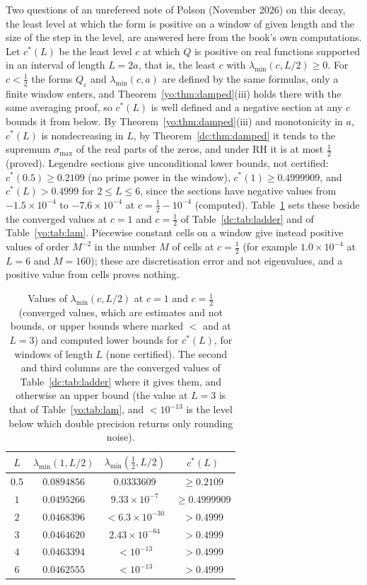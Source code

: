 Two questions of an unrefereed note of Polson (November 2026) on this decay, the least level at which the form is positive on a window of given length and the size of the step in the level, are answered here from the book's own computations. Let $c^*(L)$ be the least level $c$ at which $Q$ is positive on real functions supported in an interval of length $L=2a$, that is, the least $c$ with $\lambda_{\min}(c,L/2)\ge0$. For $c<\frac12$ the forms $Q_\varepsilon$ and $\lambda_{\min}(c,a)$ are defined by the same formulas, only a finite window enters, and Theorem~\ref{yo:thm:damped}(iii) holds there with the same averaging proof, so $c^*(L)$ is well defined and a negative section at any $c$ bounds it from below. By Theorem~\ref{yo:thm:damped}(iii) and monotonicity in $a$, $c^*(L)$ is nondecreasing in $L$, by Theorem~\ref{dc:thm:damped} it tends to the supremum $\sigma_{\max}$ of the real parts of the zeros, and under RH it is at most $\frac12$ (proved). Legendre sections give unconditional lower bounds, not certified: $c^*(0.5)\ge0.2109$ (no prime power in the window), $c^*(1)\ge0.4999909$, and $c^*(L)>0.4999$ for $2\le L\le6$, since the sections have negative values from $-1.5\times10^{-4}$ to $-7.6\times10^{-4}$ at $c=\frac12-10^{-4}$ (computed). Table~\ref{dc:tab:cstar} sets these beside the converged values at $c=1$ and $c=\frac12$ of Table~\ref{dc:tab:ladder} and of Table~\ref{yo:tab:lam}. Piecewise constant cells on a window give instead positive values of order $M^{-2}$ in the number $M$ of cells at $c=\frac12$ (for example $1.0\times10^{-4}$ at $L=6$ and $M=160$); these are discretisation error and not eigenvalues, and a positive value from cells proves nothing.

\begin{table}[ht]
\centering\small
\begin{tabular}{@{}cccc@{}}
\toprule
$L$ & $\lambda_{\min}(1,L/2)$ & $\lambda_{\min}(\frac12,L/2)$ & $c^*(L)$\\
\midrule
$0.5$ & $0.0894856$ & $0.0333609$ & $\ge0.2109$\\
$1$ & $0.0495266$ & $9.33\times10^{-7}$ & $\ge0.4999909$\\
$2$ & $0.0468396$ & $<6.3\times10^{-30}$ & $>0.4999$\\
$3$ & $0.0464620$ & $2.43\times10^{-64}$ & $>0.4999$\\
$4$ & $0.0463394$ & $<10^{-13}$ & $>0.4999$\\
$6$ & $0.0462555$ & $<10^{-13}$ & $>0.4999$\\
\bottomrule
\end{tabular}
\caption{Values of $\lambda_{\min}(c,L/2)$ at $c=1$ and $c=\frac12$ (converged values, which are estimates and not bounds, or upper bounds where marked $<$ and at $L=3$) and computed lower bounds for $c^*(L)$, for windows of length $L$ (none certified). The second and third columns are the converged values of Table~\ref{dc:tab:ladder} where it gives them, and otherwise an upper bound (the value at $L=3$ is that of Table~\ref{yo:tab:lam}, and $<10^{-13}$ is the level below which double precision returns only rounding noise).}
\label{dc:tab:cstar}
\end{table}

